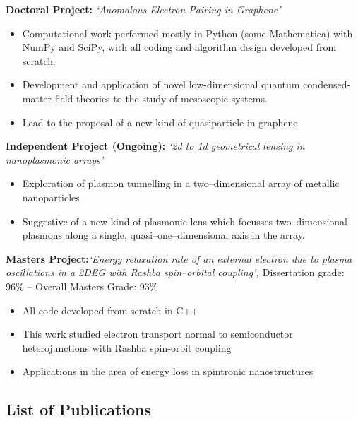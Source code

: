 \documentclass[11pt,a4paper,sans]{moderncv}        %
\begin{document}
\begin{itemize}
\small{
\item{\textbf{Doctoral Project:} \textit{\small{`Anomalous Electron Pairing in Graphene'}}
\small{\begin{itemize}
\item Computational work performed mostly in Python (some Mathematica) with NumPy and SciPy, with all coding and algorithm design developed from scratch.
\item Development and application of novel low-dimensional quantum condensed-matter field theories to the study of mesoscopic systems.
\item Lead to the proposal of a new kind of quasiparticle in graphene
\end{itemize}}}
\item{\textbf{Independent Project (Ongoing):} \textit{\small{`2d to 1d geometrical lensing in nanoplasmonic arrays'}}
\small{\begin{itemize}
\item Exploration of plasmon tunnelling in a two--dimensional array of metallic nanoparticles
\item Suggestive of a new kind of plasmonic lens which focusses two--dimensional plasmons along a single, quasi--one--dimensional axis in the array.
\end{itemize}}}
\item{\textbf{Masters Project:}\textit{\small{`Energy relaxation rate of an external electron due to plasma oscillations in a 2DEG with Rashba spin--orbital coupling', }}\small{Dissertation grade: 96\% -- Overall Masters Grade: 93\%}
\small{\begin{itemize}
\item All code developed from scratch in C++
\item This work studied electron transport normal to semiconductor heterojunctions with Rashba spin-orbit coupling
\item Applications in the area of energy loss in spintronic nanostructures
\end{itemize}}}}
\end{itemize}
\vspace{5pt}
\subsection{List of Publications}

\vspace{5pt}
\end{document}
